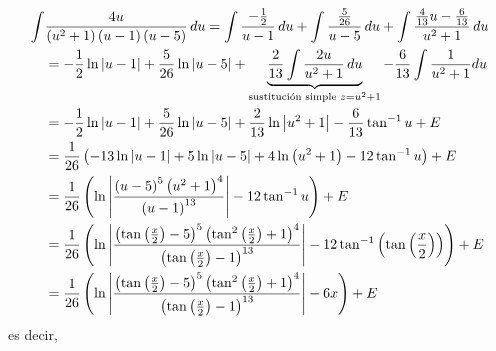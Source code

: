{\small
\begin{align*}
\int &\frac{4u}{\left( u^{2}+1\right) \left( u-1\right) \left( u-5\right) }\, du=\int \frac{-\frac{1}{2}}{u-1}\, du+\int \frac{\frac{5}{26}}{u-5}\, du+\int \frac{%
\frac{4}{13}u-\frac{6}{13}}{u^{2}+1}\, du \\
&=-\frac{1}{2}\ln \left\vert u-1\right\vert +\frac{5}{26}\ln \left\vert
u-5\right\vert +\underbrace{\frac{2}{13}\int \frac{2u}{u^{2}+1}\, du}_{\text{sustitución simple } z=u^2+1} -\frac{6}{13}\int \frac{1}{u^{2}+1}du \\
&=-\frac{1}{2}\ln \left\vert u-1\right\vert +\frac{5}{26}\ln \left\vert
u-5\right\vert +\frac{2}{13}\ln \left\vert u^{2}+1\right\vert -\frac{6}{13}\tan^{-1} u+E\\
&=\frac{1}{26}\left( -13\ln \left\vert u-1\right\vert +5\ln \left\vert
u-5\right\vert +4\ln \left( u^{2}+1\right) -12\tan^{-1} u\right)+E\\
&=\frac{1}{26}\left( \ln \left\vert \frac{\left( u-5\right) ^{5}\left(
u^{2}+1\right) ^{4}}{\left( u-1\right) ^{13}}\right\vert -12\tan^{-1} u\right)+E\\
&=\frac{1}{26}\left( \ln \left\vert \frac{\left( \tan \left( \frac{x}{2}%
\right) -5\right) ^{5}\left( \tan ^{2}\left( \frac{x}{2}\right) +1\right)
^{4}}{\left( \tan \left( \frac{x}{2}\right) -1\right) ^{13}}\right\vert
-12\tan^{-1} \left( \tan \left( \frac{x}{2}\right) \right) \right)+E\\
&=\frac{1}{26}\left( \ln \left\vert \frac{\left( \tan \left( \frac{x}{2}%
\right) -5\right) ^{5}\left( \tan ^{2}\left( \frac{x}{2}\right) +1\right)
^{4}}{\left( \tan \left( \frac{x}{2}\right) -1\right) ^{13}}\right\vert
-6x\right) +E
\end{align*}
}
es decir,



